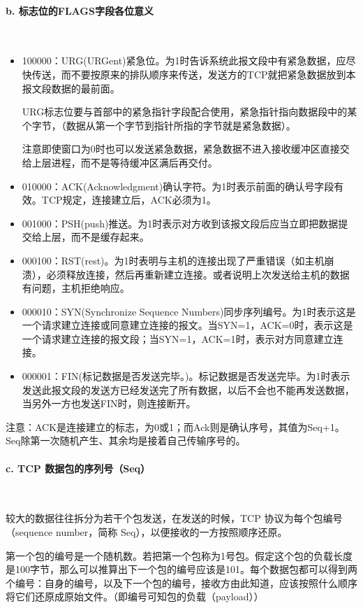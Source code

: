 \documentclass[UTF8]{article}%
\begin{document}
\paragraph{b. 标志位的FLAGS字段各位意义}~{}

\begin{itemize}
    \item 100000：URG(URGent)紧急位。为1时告诉系统此报文段中有紧急数据，应尽快传送，而不要按原来的排队顺序来传送，发送方的TCP就把紧急数据放到本报文段数据的最前面。
    
    URG标志位要与首部中的紧急指针字段配合使用，紧急指针指向数据段中的某个字节，（数据从第一个字节到指针所指的字节就是紧急数据）。
    
    注意即使窗口为0时也可以发送紧急数据，紧急数据不进入接收缓冲区直接交给上层进程，而不是等待缓冲区满后再交付。

    \item 010000：ACK(Acknowledgment)确认字符。为1时表示前面的确认号字段有效。TCP规定，连接建立后，ACK必须为1。
    \item 001000：PSH(push)推送。为1时表示对方收到该报文段后应当立即把数据提交给上层，而不是缓存起来。
    \item 000100：RST(rest)。为1时表明与主机的连接出现了严重错误（如主机崩溃），必须释放连接，然后再重新建立连接。或者说明上次发送给主机的数据有问题，主机拒绝响应。
    \item 000010：SYN(Synchronize Sequence Numbers)同步序列编号。为1时表示这是一个请求建立连接或同意建立连接的报文。当SYN=1，ACK=0时，表示这是一个请求建立连接的报文段；当SYN=1，ACK=1时，表示对方同意建立连接。
    \item 000001：FIN(标记数据是否发送完毕。)。标记数据是否发送完毕。为1时表示发送此报文段的发送方已经发送完了所有数据，以后不会也不能再发送数据，当另外一方也发送FIN时，则连接断开。
\end{itemize}

注意：ACK是连接建立的标志，为0或1；而Ack则是确认序号，其值为Seq+1。Seq除第一次随机产生、其余均是接着自己传输序号的。

\paragraph{c. TCP 数据包的序列号（Seq）}~{}

较大的数据往往拆分为若干个包发送，在发送的时候，TCP 协议为每个包编号（sequence number，简称 Seq），以便接收的一方按照顺序还原。

第一个包的编号是一个随机数。若把第一个包称为1号包。假定这个包的负载长度是100字节，那么可以推算出下一个包的编号应该是101。每个数据包都可以得到两个编号：自身的编号，以及下一个包的编号，接收方由此知道，应该按照什么顺序将它们还原成原始文件。（即编号可知包的负载（payload））
\end{document}
